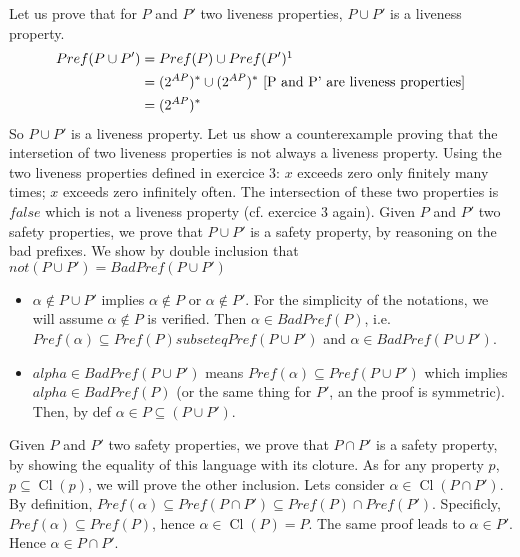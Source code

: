 \documentclass[11pt,a4paper]{article}
\DeclareMathOperator{\Cl}{Cl}
\begin{document}
\begin{Answer}[number=5]
\Question%
Let us prove that for $P$ and $P'$ two liveness properties, $P \cup P'$ is a liveness property. 
\begin{align*}Pref(P \cup P') &= Pref(P) \cup Pref(P')\footnotemark[1]\\ 
                              &= (2^{AP})^* \cup (2^{AP})^* \text{ [P and P' are liveness properties]}\\ 
                              &= (2^{AP})^*
\end{align*}
So $P \cup P'$ is a liveness property.
\Question%
Let us show a counterexample proving that the intersetion of two liveness properties is not always a liveness property.
Using the two liveness properties defined in exercice 3: $x$ exceeds zero only finitely many times; $x$ exceeds zero infinitely often.
The intersection of these two properties is $false$ which is not a liveness property (cf. exercice 3 again).
\Question%
Given $P$ and $P'$ two safety properties, we prove that $P\cup P'$ is a safety property, by reasoning on the bad prefixes. We show by double inclusion that $ not( P\cup P') = BadPref( P\cup P')$
\begin{itemize} 
\item $\alpha \notin P\cup P'$ implies $\alpha \notin P$ or $\alpha \notin P'$. 
For the simplicity of the notations, we will assume $\alpha \notin P$ is verified. Then $\alpha \in BadPref(P)$, i.e. $Pref(\alpha) \subseteq Pref(P) subseteq Pref(P \cup P')$ and $\alpha \in BadPref(P \cup P')$.
\item $alpha \in BadPref(P\cup P')$ means $Pref(\alpha) \subseteq Pref(P \cup P')$ which implies $alpha \in BadPref(P)$ (or the same thing for $P'$, an the proof is symmetric). Then, by def $\alpha \in P \subseteq (P \cup P')$.
\end{itemize}
\Question%
Given $P$ and $P'$ two safety properties, we prove that $P\cap P'$ is a safety property, by showing the equality of this language with its cloture.
As for any property $p$, $p \subseteq \Cl(p)$, we will prove the other inclusion. Lets consider $\alpha \in \Cl(P\cap P')$. By definition, $Pref(\alpha) \subseteq Pref(P\cap P') \subseteq Pref(P) \cap Pref(P')$\footnotemark[2].
Specificly, $Pref(\alpha) \subseteq Pref(P)$, hence $\alpha \in \Cl(P) = P$. The same proof leads to $\alpha \in P'$. Hence $\alpha \in P\cap P'$.


\end{Answer}
\end{document}
